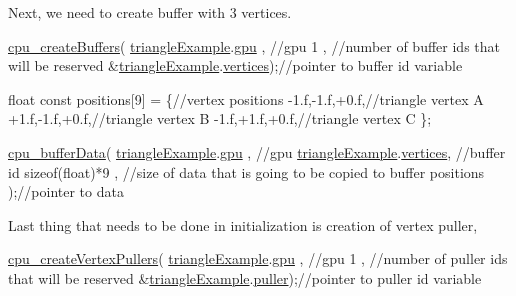 Next, we need to create buffer with 3 vertices. 
\begin{DoxyCodeInclude}
  \hyperlink{buffer_8h_a6ba9c58dc4b7bc81e83d3dae3c6b292f}{cpu\_createBuffers}(
      \hyperlink{triangleExample_8c_af82b723635ac0c90962571915a1b1163}{triangleExample}.\hyperlink{structTriangleExampleVariables_a6c5c3f82065ae9aac07f9e6f11dd03b3}{gpu}      , \textcolor{comment}{//gpu}
      1                        , \textcolor{comment}{//number of buffer ids that will be reserved}
      &\hyperlink{triangleExample_8c_af82b723635ac0c90962571915a1b1163}{triangleExample}.\hyperlink{structTriangleExampleVariables_acb7968b625f2e01866994769209cf32e}{vertices});\textcolor{comment}{//pointer to buffer id variable}

  \textcolor{keywordtype}{float} \textcolor{keyword}{const} positions[9] = \{\textcolor{comment}{//vertex positions}
    -1.f,-1.f,+0.f,\textcolor{comment}{//triangle vertex A}
    +1.f,-1.f,+0.f,\textcolor{comment}{//triangle vertex B}
    -1.f,+1.f,+0.f,\textcolor{comment}{//triangle vertex C}
  \};

  \hyperlink{buffer_8h_aad292278b58c11db74df3cb3e3a52f22}{cpu\_bufferData}(
      \hyperlink{triangleExample_8c_af82b723635ac0c90962571915a1b1163}{triangleExample}.\hyperlink{structTriangleExampleVariables_a6c5c3f82065ae9aac07f9e6f11dd03b3}{gpu}     , \textcolor{comment}{//gpu}
      \hyperlink{triangleExample_8c_af82b723635ac0c90962571915a1b1163}{triangleExample}.\hyperlink{structTriangleExampleVariables_acb7968b625f2e01866994769209cf32e}{vertices}, \textcolor{comment}{//buffer id}
      \textcolor{keyword}{sizeof}(\textcolor{keywordtype}{float})*9         , \textcolor{comment}{//size of data that is going to be copied to buffer}
      positions               );\textcolor{comment}{//pointer to data}
\end{DoxyCodeInclude}
Last thing that needs to be done in initialization is creation of vertex puller, 
\begin{DoxyCodeInclude}
  \hyperlink{vertexPuller_8h_a3b9678475f48f09c3ddbd4316fce3e08}{cpu\_createVertexPullers}(
      \hyperlink{triangleExample_8c_af82b723635ac0c90962571915a1b1163}{triangleExample}.\hyperlink{structTriangleExampleVariables_a6c5c3f82065ae9aac07f9e6f11dd03b3}{gpu}    , \textcolor{comment}{//gpu}
      1                      , \textcolor{comment}{//number of puller ids that will be reserved}
      &\hyperlink{triangleExample_8c_af82b723635ac0c90962571915a1b1163}{triangleExample}.\hyperlink{structTriangleExampleVariables_a82e39dd0d18fc57422686229d801e39f}{puller});\textcolor{comment}{//pointer to puller id variable}
\end{DoxyCodeInclude}
